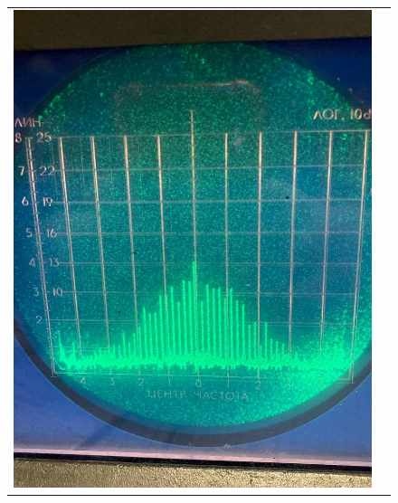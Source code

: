 \documentclass[a4paper, fontsize = 14pt]{article}
\begin{document}
\begin{figure}[hbt]
\centering
\begin{tabular}{cc}
\includegraphics[scale=0.3]{lab361ris3.png}

\end{tabular}
\end{figure}
\end{document}
